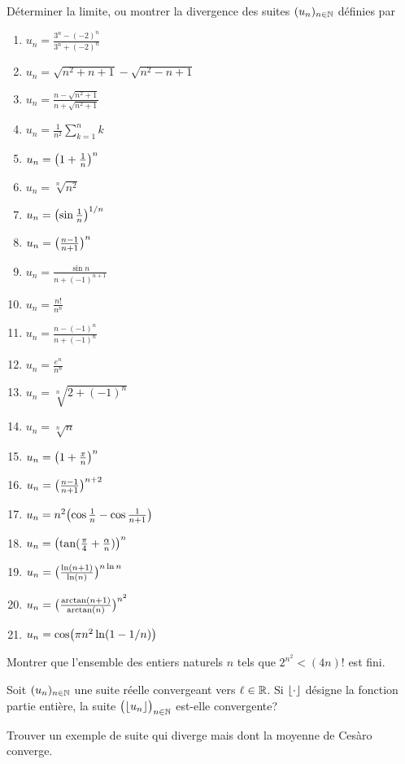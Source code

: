 \documentclass{yann}
\newcommand\U{(u_n)_{n\in\N}}
\begin{document}
Déterminer la limite, ou montrer la divergence des suites $\U$ définies par
\begin{enumerate}
  \item
$u_n = \frac{3^n-(-2)^n}{3^n+(-2)^n}$
  \item
$u_n = \sqrt{n^2+n+1} - \sqrt{n^2-n+1}$
  \item
$u_n = \frac{n-\sqrt{n^2+1}}{n+\sqrt{n^2+1}}$
  \item
$u_n = \frac{1}{n^2} \sum_{k=1}^n k$
  \item
$u_n = \bigl({1+\frac1n}\bigr)^n$
  \item
$u_n = \sqrt[n]{n^2}$
  \item
$u_n = \bigl({\sin\frac1n}\bigr)^{1/n}$
  \item
$u_n = \bigl({\frac{n-1}{n+1}}\bigr)^n$
  \item
$u_n = \frac{\sin n}{n+(-1)^{n+1}}$
  \item
$u_n = \frac{n!}{n^n}$
  \item
$u_n = \frac{n-(-1)^n}{n+(-1)^n}$
  \item
$u_n = \frac{e^n}{n^n}$
  \item
$u_n = \sqrt[n]{2+(-1)^n}$
  \item
$u_n = \sqrt[n]{n}$
  \item
$u_n = \bigl({1+\frac xn}\bigr)^n$
  \item
$u_n = \bigl({\frac{n-1}{n+1}}\bigr)^{n+2}$
  \item
$u_n = n^2 \bigl({\cos\frac{1}{n} - \cos\frac{1}{n+1}}\bigr)$
  \item
$u_n = \bigl({\tan({\frac\pi4 + \frac{\alpha}{n}})}\bigr)^n$
  \item
$u_n = \bigl({\frac{\ln(n+1)}{\ln(n)}}\bigr)^{n\ln n}$
  \item
$u_n = \bigl({\frac{\arctan(n+1)}{\arctan(n)}}\bigr)^{n^2}$
  \item
$u_n = \cos\bigl({\pi n^2 \ln(1-1/n)}\bigr)$
\end{enumerate}

\Exercice

Montrer que l'ensemble des entiers naturels $n$ tels que $2^{n^2} < (4n)!$ est fini.

\Exercice

Soit $\U$ une suite réelle convergeant vers $\ell\in\mathbb{R}$.
Si $\lfloor\cdot\rfloor$ désigne la fonction partie entière,
la suite $\bigl({\lfloor u_n\rfloor}\bigr)_{n\in\mathbb{N}}$ est-elle convergente?

\Exercice

Trouver un exemple de suite qui diverge mais dont la moyenne de Cesàro converge.
\end{document}
